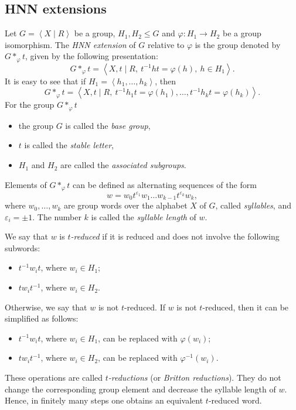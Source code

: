 \documentclass[12pt,oneside]{amsart}
\theoremstyle{definition}
\theoremstyle{case}
\newcommand{\gp}[1]{{\left\langle #1 \right\rangle}}
\newcommand{\gpr}[2]{{\left\langle #1 \mid #2 \right\rangle}}
\begin{document}
\subsection{HNN extensions}
\label{se:HNN}


Let $G=\gpr{X}{R}$ be a group, $H_1,H_2\le G$ and $\varphi:H_1\rightarrow H_2$ 
be a group isomorphism.
The \emph{HNN extension} of $G$ relative to $\varphi$ is the group
denoted by $G\ast_\varphi t$,  given by the following presentation:
$$
G\ast_\varphi t = \gpr{X,t}{R,~ t^{-1}ht = \varphi(h),~ h\in H_1}.
$$
It is easy to see that if $H_1 = \gp{h_1,\ldots,h_k}$, then
$$
G\ast_\varphi t=
\gp{X,t \mid R,~ t^{-1}h_1t = \varphi(h_1),\ldots,t^{-1}h_kt = \varphi(h_k)}.
$$
For the group $G\ast_\varphi t$
\begin{itemize}
\item
the group $G$ is called the \emph{base group},
\item
$t$ is called the \emph{stable letter},
    \item
$H_1$ and $H_2$ are called the \emph{associated subgroups}.
\end{itemize}
Elements of $G\ast_{\varphi} t$ can be defined as alternating sequences
of the form
\begin{equation}\label{eq:w}
w =
w_0 t^{\varepsilon_1}
w_1 \dots 
w_{k-1} t^{\varepsilon_k} w_k,
\end{equation}
where $w_0,\dots,w_k$ are group words over the alphabet $X$ of $G$,
called \emph{syllables},
and $\varepsilon_i = \pm 1$.
The number $k$ is called the \emph{syllable length} of $w$.

We say that $w$ is \emph{$t$-reduced} if it is reduced and
does not involve the following subwords:
\begin{itemize}
\item
$t^{-1} w_i t$, where $w_i\in H_1$;
\item
$t w_i t^{-1}$, where $w_i\in H_2$.
\end{itemize}
Otherwise, we say that $w$ is not $t$-reduced.
If $w$ is not $t$-reduced, then it can be simplified as follows:
\begin{itemize}
\item
$t^{-1} w_i t$, where $w_i\in H_1$, can be replaced with $\varphi(w_i)$;
\item
$t w_i t^{-1}$, where $w_i\in H_2$, can be replaced with $\varphi^{-1}(w_i)$.
\end{itemize}
These operations are called \emph{$t$-reductions} (or \emph{Britton reductions}).
They do not change the corresponding group element and decrease
the syllable length of $w$.
Hence, in finitely many steps one obtains an equivalent $t$-reduced word.
\end{document}
